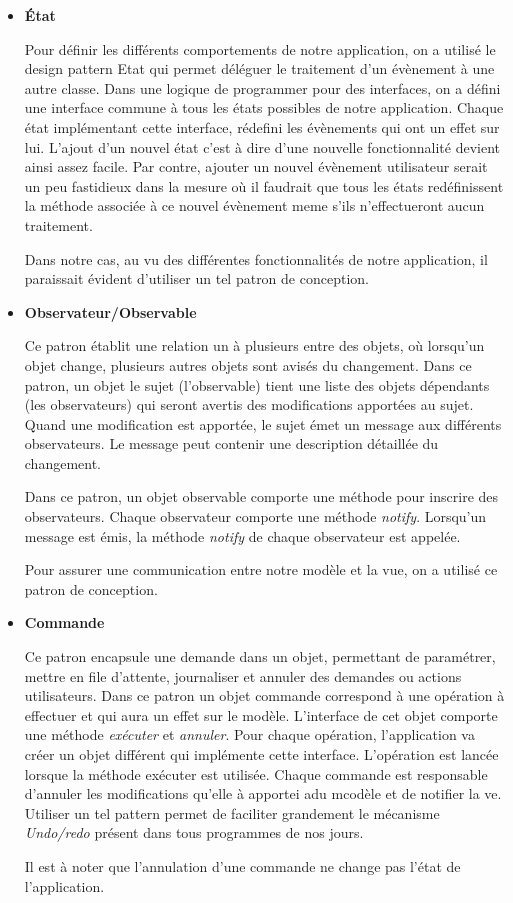\documentclass[10pt,a4paper]{book}
\begin{document}
\begin{itemize}
\item{\textbf{État}} 
	
Pour définir les différents comportements de notre application, on a utilisé le design pattern Etat qui permet déléguer le traitement d'un évènement à une autre classe. Dans une logique de programmer pour des interfaces, on a défini une interface commune à tous les états possibles de notre application. Chaque état implémentant cette interface, rédefini les évènements qui ont un effet sur lui. L'ajout d'un nouvel état c'est à dire d'une nouvelle fonctionnalité devient ainsi assez facile. Par contre, ajouter un nouvel évènement utilisateur serait un peu fastidieux dans la mesure où il faudrait que tous les états redéfinissent la méthode associée à ce nouvel évènement meme s'ils n'effectueront aucun traitement.

Dans notre cas, au vu des différentes fonctionnalités de notre application, il paraissait évident d'utiliser un tel patron de conception.	


\item \textbf{Observateur/Observable}
	
Ce patron établit une relation un à plusieurs entre des objets, où lorsqu'un objet change, plusieurs autres objets sont avisés du changement. Dans ce patron, un objet le sujet (l'observable) tient une liste des objets dépendants (les observateurs) qui seront avertis des modifications apportées au sujet. Quand une modification est apportée, le sujet émet un message aux différents observateurs. Le message peut contenir une description détaillée du changement. 

Dans ce patron, un objet observable comporte une méthode pour inscrire des observateurs. Chaque observateur comporte une méthode \textit{notify}. Lorsqu'un message est émis,  la méthode \textit{notify} de chaque observateur est appelée.

Pour assurer une communication entre notre modèle et la vue, on a utilisé ce patron de conception.

\item \textbf{Commande}

Ce patron encapsule une demande dans un objet, permettant de paramétrer, mettre en file d'attente, journaliser et annuler des demandes ou actions utilisateurs. Dans ce patron un objet commande correspond à une opération à effectuer et qui aura un effet sur le modèle. L'interface de cet objet comporte une méthode \textit{exécuter} et \textit{annuler}. Pour chaque opération, l'application va créer un objet différent qui implémente cette interface. L'opération est lancée lorsque la méthode exécuter est utilisée. Chaque commande est responsable d'annuler les modifications qu'elle à apportei adu mcodèle et de notifier la ve.  Utiliser un tel pattern permet de faciliter grandement le mécanisme \textit{Undo/redo} présent dans tous programmes de nos jours.

Il est à noter que l'annulation d'une commande ne change pas l'état de l'application.
\end{itemize}
\newpage
\end{document}
